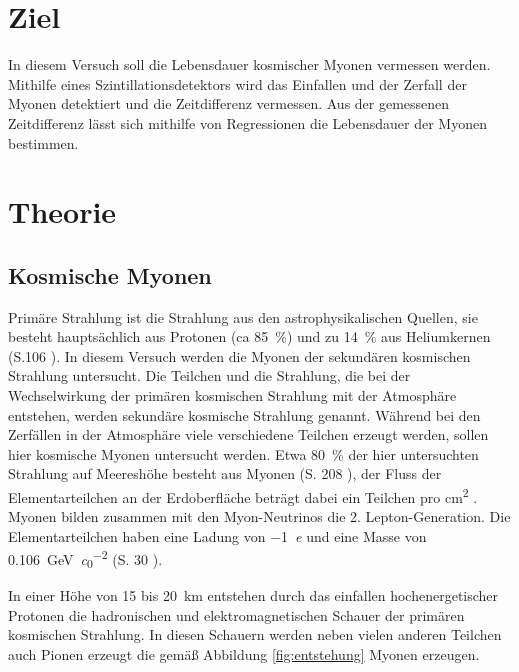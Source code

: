 \section{Ziel}
In diesem Versuch soll die Lebensdauer kosmischer Myonen vermessen werden.
Mithilfe eines Szintillationsdetektors wird das Einfallen und der Zerfall der Myonen detektiert und die Zeitdifferenz vermessen.
Aus der gemessenen Zeitdifferenz lässt sich mithilfe von Regressionen die Lebensdauer der Myonen bestimmen.
\setcounter{page}{1}
\section{Theorie}
\label{sec:Theorie}
\subsection{Kosmische Myonen}
\label{sec:myonen}
Primäre Strahlung ist die Strahlung aus den astrophysikalischen Quellen, sie besteht hauptsächlich aus Protonen (ca \SI{85}{\percent}) und zu \SI{14}{\percent} aus Heliumkernen (S.\num{106} \cite{source1}).
In diesem Versuch werden die Myonen der sekundären kosmischen Strahlung untersucht.
Die Teilchen und die Strahlung, die bei der Wechselwirkung der primären kosmischen Strahlung mit der Atmosphäre entstehen, werden sekundäre kosmische Strahlung genannt.
Während bei den Zerfällen in der Atmosphäre viele verschiedene Teilchen erzeugt werden, sollen hier kosmische Myonen untersucht werden.
Etwa \SI{80}{\percent} der hier untersuchten Strahlung auf Meereshöhe besteht aus Myonen (S. \num{208} \cite{source1}), der Fluss der Elementarteilchen an der Erdoberfläche beträgt dabei ein Teilchen pro \si{\square \centi \metre} .
Myonen bilden zusammen mit den Myon-Neutrinos die 2. Lepton-Generation.
Die Elementarteilchen haben eine Ladung von \SI{-1}{\elementarycharge} und eine Masse von \SI[per-mode=symbol]{0.106}{\giga \eV \per \clight \squared} (S. \num{30} \cite{source1}).

In einer Höhe von \num{15} bis \SI{20}{\kilo\metre} entstehen durch das einfallen hochenergetischer Protonen die hadronischen und elektromagnetischen Schauer der primären kosmischen Strahlung.
In diesen Schauern werden neben vielen anderen Teilchen auch Pionen erzeugt die gemäß Abbildung \ref{fig:entstehung} Myonen erzeugen.

